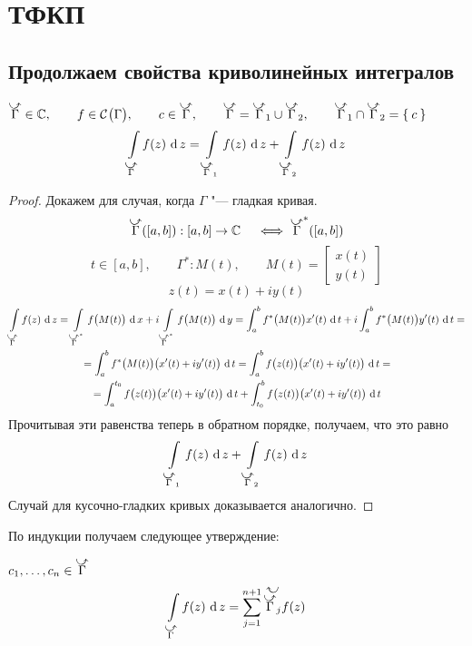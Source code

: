 \chapter{ТФКП}

\section{Продолжаем свойства криволинейных интегралов}

\begin{property}[6]
	$ \curvedir \Gamma \in \Co, \qquad f \in \Cont \Gamma, \qquad c \in \curvedir \Gamma, \qquad \curvedir \Gamma = \curvedir \Gamma_1 \cup \curvedir \Gamma_2, \qquad \curvedir\Gamma_1 \cap \curvedir\Gamma_2 = \set c $
	$$ \cint[z]{\curvedir \Gamma}{f(z)} = \cint[z]{\curvedir\Gamma_1}{f(z)} + \cint[z]{\curvedir\Gamma_2}{f(z)} $$
\end{property}

\begin{proof}
	Докажем для случая, когда $ \Gamma $ "--- гладкая кривая.
	$$ \curvedir\Gamma([a, b]) : [a, b] \to \Co \quad \iff \curvedir\Gamma^*([a, b]) $$
	$$ t \in [a, b], \qquad \Gamma^* : M(t), \qquad M(t) =
	\begin{bmatrix}
		x(t) \\
		y(t)
	\end{bmatrix} $$
	$$ z(t) = x(t) + iy(t) $$
	\begin{multline*}
		\cint[z]{\curvedir \Gamma}{f(z)} = \cint[x]{\curvedir\Gamma^*}{f \big( M(t) \big)} + i \cint[y]{\curvedir\Gamma^*}{f \big( M(t) \big)} = \dint[t]ab{ f^* \big( M(t) \big)x'(t)} + i \dint[t]ab{f^* \big( M(t) \big) y'(t)} = \\
		= \dint[t]ab{ f^* \big( M(t) \big) \big( x'(t) + iy'(t) \big)} = \dint[t]ab{f \big( z(t) \big) \big( x'(t) + iy'(t) \big)} = \\
		= \dint[t]a{t_0}{ f \big( z(t) \big) \big( x'(t) + iy'(t) \big)} + \dint[t]{t_0}b{ f \big( z(t) \big) \big( x'(t) + iy'(t) \big)}
	\end{multline*}
	Прочитывая эти равенства теперь в обратном порядке, получаем, что это равно
	$$ \cint[z]{\curvedir\Gamma_1}{f(z)} + \cint[z]{\curvedir\Gamma_2}{f(z)} $$
	Случай для кусочно-гладких кривых доказывается аналогично.
\end{proof}

По индукции получаем следующее утверждение:

\begin{property}
	$ c_1, \dots, c_n \in \curvedir\Gamma $
	$$ \cint[z]{\curvedir\Gamma}{f(z)} = \sum_{j = 1}^{n + 1} \curvedir[z]{\curvedir\Gamma_j}{f(z)} $$
\end{property}

